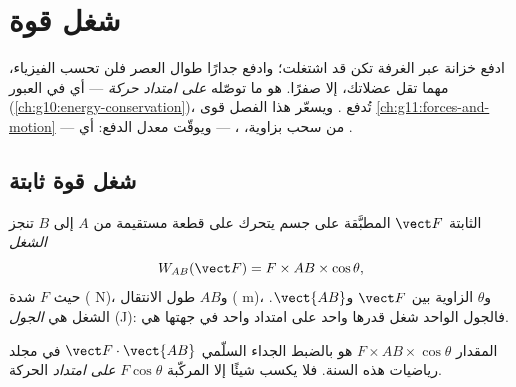 \chapter{شغل قوة}\label{ch:g11:work-of-force}

ادفع خزانة عبر الغرفة تكن قد اشتغلت؛ وادفع جدارًا
طوال العصر فلن تحسب الفيزياء، مهما تقل عضلاتك، إلا
صفرًا.  هو ما توصّله  \emph{على امتداد حركة} --- أي 
في العبور (\cref{ch:g10:energy-conservation})، تُدفع . ويسعّر
هذا الفصل قوى \cref{ch:g11:forces-and-motion} --- من سحب
بزاوية، ،  --- ويوقّت معدل الدفع: أي .

\section{شغل قوة ثابتة}

\begin{definition}\label{def:g11:work-of-force:work}
 الثابتة $\vect F$ المطبَّقة على جسم يتحرك على قطعة
مستقيمة من $A$ إلى $B$ تنجز \emph{الشغل}
\[
W_{AB}(\vect F) = F \times AB \times \cos\theta ,
\]
حيث $F$ شدة  ( \unit{N})، و$AB$ طول
الانتقال ( \unit{m})، و$\theta$ الزاوية بين
$\vect F$ و$\vect{AB}$.  الشغل هي
\emph{الجول} (\unit{J}): فالجول الواحد شغل 
قدرها  واحد على امتداد  واحد في جهتها هي.
\end{definition}

\begin{remark}\label{rem:g11:work-of-force:scal}
المقدار $F \times AB \times \cos\theta$ هو بالضبط الجداء السلّمي
$\vect F \cdot \vect{AB}$ في مجلد رياضيات هذه السنة. فلا يكسب شيئًا
إلا المركّبة $F\cos\theta$ \emph{على امتداد} الحركة.
\end{remark}

